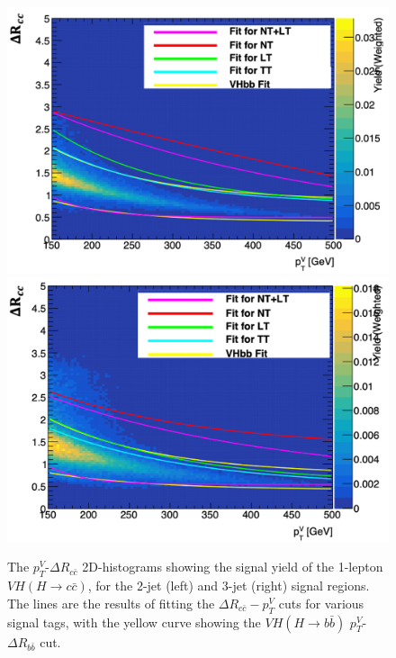 \begin{figure}[h!]
\center
\includegraphics[scale=0.4]{Images/VH/dRccpTV/sr1.png}
\includegraphics[scale=0.4]{Images/VH/dRccpTV/sr2.png}
\caption{The $p_T^V$-$\Delta R_{c\bar{c}}$ 2D-histograms showing the signal yield of the 1-lepton $VH(H\rightarrow c\bar{c})$, for the 2-jet (left) and 3-jet (right) signal regions. The lines are the results of fitting the $\Delta R_{c\bar{c}}-p_T^V$ cuts for various signal tags, with the yellow curve showing the $VH(H\rightarrow b\bar{b})$ $p_T^V$-$\Delta R_{b\bar{b}}$ cut.} 
\label{fig:drccptvCutsVHcc}
\end{figure}

